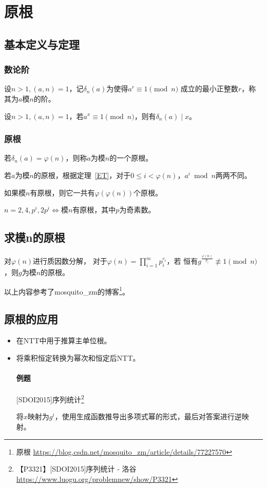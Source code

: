 \section{原根}\label{PrimitiveRoot}
\subsection{基本定义与定理}
\subsubsection{数论阶}
设$n>1,(a,n)=1$，记$\delta_n(a)$为使得$a^r\equiv 1 \pmod{n}$
成立的最小正整数$r$，称其为$a$模$n$的阶。

\begin{theorem}
	设$n>1,(a,n)=1$，若$a^x\equiv 1 \pmod{n}$，则有$\delta_n(a)\mid x$。
\end{theorem}

\subsubsection{原根}
若$\delta_n(a)=\varphi(n)$，则称$a$为模$n$的一个原根。

若$a$为模$n$的原根，根据定理~\ref{ET}，对于$0\leq i< \varphi(n)$，$a^i\bmod{n}$两两不同。

\begin{theorem}
	如果模$n$有原根，则它一共有$\varphi(\varphi(n))$个原根。
\end{theorem}

\begin{theorem}
	$n=2,4,p^i,2p^i\Leftrightarrow$模$n$有原根，其中$p$为奇素数。
\end{theorem}

\subsection{求模n的原根}

对$\varphi(n)$进行质因数分解，
对于$\displaystyle \varphi(n)=\prod_{i=1}^m{p_i^{c_i}}$，若
恒有$g^\frac{\varphi(n)}{p_i}\not\equiv 1 \pmod{n}$，则$g$为模$n$的原根。

以上内容参考了mosquito\_zm的博客\footnote{原根
	\url{https://blog.csdn.net/mosquito\_zm/article/details/77227570}}。
\subsection{原根的应用}
\begin{itemize}
	\item 在NTT中用于推算主单位根。
	\item 将乘积恒定转换为幂次和恒定后NTT。
	\paragraph{例题} [SDOI2015]序列统计\footnote{【P3321】[SDOI2015]序列统计 - 洛谷
	\url{https://www.luogu.org/problemnew/show/P3321}}

	将$x$映射为$g^i$，使用生成函数推导出多项式幂的形式，最后对答案进行逆映射。

	

\end{itemize}
